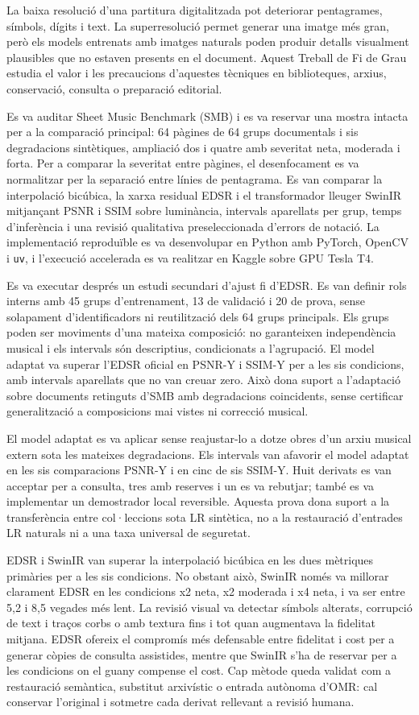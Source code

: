 La baixa resolució d'una partitura digitalitzada pot deteriorar pentagrames, símbols, dígits i
text. La superresolució permet generar una imatge més gran, però els models entrenats amb imatges
naturals poden produir detalls visualment plausibles que no estaven presents en el document. Aquest
Treball de Fi de Grau estudia el valor i les precaucions d'aquestes tècniques en biblioteques,
arxius, conservació, consulta o preparació editorial.

Es va auditar Sheet Music Benchmark (SMB) i es va reservar una mostra intacta per a la comparació
principal: 64 pàgines de 64 grups documentals i sis degradacions
sintètiques, ampliació dos i quatre amb severitat neta, moderada i forta. Per a comparar
la severitat entre pàgines, el desenfocament es va normalitzar per la separació
entre línies de pentagrama. Es van comparar la interpolació bicúbica, la xarxa residual EDSR i el
transformador lleuger SwinIR mitjançant PSNR i SSIM sobre luminància, intervals aparellats per grup,
temps d'inferència i una revisió qualitativa preseleccionada d'errors de notació. La implementació
reproduïble es va desenvolupar en Python amb PyTorch, OpenCV i \texttt{uv}, i l'execució accelerada
es va realitzar en Kaggle sobre GPU Tesla T4.

Es va executar després un estudi secundari d'ajust fi
d'EDSR. Es van definir rols interns amb 45 grups d'entrenament, 13 de validació i 20 de
prova, sense solapament d'identificadors ni reutilització dels 64 grups principals.
Els grups poden ser moviments d'una mateixa composició: no garanteixen independència
musical i els intervals són descriptius, condicionats a l'agrupació. El model adaptat va superar
l'EDSR oficial en PSNR-Y i SSIM-Y per a les sis condicions, amb intervals aparellats que no van
creuar zero. Això dona suport a l'adaptació sobre documents retinguts d'SMB amb degradacions
coincidents, sense certificar generalització a composicions mai vistes ni correcció musical.

El model adaptat es va aplicar sense reajustar-lo a dotze obres d'un
arxiu musical extern sota les mateixes degradacions. Els intervals van afavorir el model adaptat en
les sis comparacions PSNR-Y i en cinc de sis SSIM-Y. Huit derivats es van acceptar per a consulta,
tres amb reserves i un es va rebutjar; també es va implementar un demostrador local reversible.
Aquesta prova dona suport a la transferència entre col·leccions sota LR sintètica, no a la
restauració d'entrades LR naturals ni a una taxa universal de seguretat.

EDSR i SwinIR van superar la interpolació bicúbica en les dues mètriques primàries per a les sis
condicions. No obstant això, SwinIR només va millorar clarament EDSR en les condicions x2 neta, x2
moderada i x4 neta, i va ser entre 5,2 i 8,5 vegades més lent. La revisió visual va detectar símbols
alterats, corrupció de text i traços corbs o amb textura fins i tot quan augmentava la fidelitat
mitjana. EDSR ofereix el compromís més defensable entre fidelitat i cost per a generar
còpies de consulta assistides, mentre que SwinIR s'ha de reservar per a les condicions on el guany
compense el cost. Cap mètode queda validat com a restauració semàntica, substitut arxivístic o
entrada autònoma d'OMR: cal conservar l'original i sotmetre cada derivat rellevant a revisió humana.
